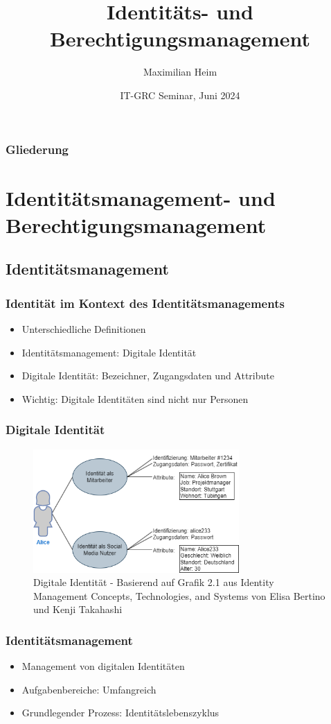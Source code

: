 \documentclass[11pt]{beamer}
\author{Maximilian Heim\inst{1}}
\institute[HS-AS]
{
  \inst{1}
  Hochschule Albstadt-Sigmaringen
}
\title{Identitäts- und Berechtigungsmanagement}
\date[IT-GRC 2024]{IT-GRC Seminar, Juni 2024}
\begin{document}
\frame{\titlepage}
\begin{frame}
  \frametitle{Gliederung}
  \tableofcontents
\end{frame}
\section{Identitätsmanagement- und Berechtigungsmanagement}
\subsection{Identitätsmanagement}
\begin{frame}
  \frametitle{Identität im Kontext des Identitätsmanagements}
  \begin{itemize}
    \item Unterschiedliche Definitionen
    \item Identitätsmanagement: Digitale Identität
    \item Digitale Identität: Bezeichner, Zugangsdaten und Attribute
    \item Wichtig: Digitale Identitäten sind nicht nur Personen
  \end{itemize}
\end{frame}

\begin{frame}
  \frametitle{Digitale Identität}
  \begin{figure}[H]
    \centering
    \includegraphics[width=0.7\textwidth]{assets/identity.png}
    \caption{Digitale Identität - Basierend auf Grafik 2.1 aus \glqq{}Identity Management Concepts, Technologies, and Systems\grqq{} von Elisa Bertino und Kenji Takahashi}
  \end{figure}
\end{frame}
\begin{frame}
  \frametitle{Identitätsmanagement}
  \begin{itemize}
    \item Management von digitalen Identitäten
    \item Aufgabenbereiche: Umfangreich
    \item Grundlegender Prozess: Identitätslebenszyklus
  \end{itemize}
\end{frame}
\end{document}

